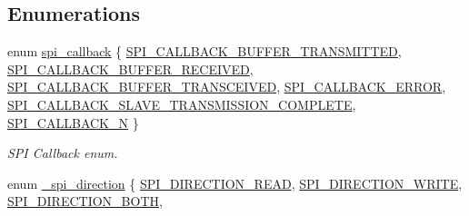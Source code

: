 \subsection*{Enumerations}
\begin{DoxyCompactItemize}
\item 
enum \mbox{\hyperlink{group__asfdoc__sam0__sercom__spi__group_ga4afb8830e0197ec11f6beb8140210a88}{spi\+\_\+callback}} \{ \newline
\mbox{\hyperlink{group__asfdoc__sam0__sercom__spi__group_gga4afb8830e0197ec11f6beb8140210a88a457c19f75d284d1664cc38b0f1e1eb81}{S\+P\+I\+\_\+\+C\+A\+L\+L\+B\+A\+C\+K\+\_\+\+B\+U\+F\+F\+E\+R\+\_\+\+T\+R\+A\+N\+S\+M\+I\+T\+T\+ED}}, 
\mbox{\hyperlink{group__asfdoc__sam0__sercom__spi__group_gga4afb8830e0197ec11f6beb8140210a88a7da8cc036860fc86ef36aeeffe9088ec}{S\+P\+I\+\_\+\+C\+A\+L\+L\+B\+A\+C\+K\+\_\+\+B\+U\+F\+F\+E\+R\+\_\+\+R\+E\+C\+E\+I\+V\+ED}}, 
\mbox{\hyperlink{group__asfdoc__sam0__sercom__spi__group_gga4afb8830e0197ec11f6beb8140210a88ac2110b62e8233f66ccecd240e8d256a8}{S\+P\+I\+\_\+\+C\+A\+L\+L\+B\+A\+C\+K\+\_\+\+B\+U\+F\+F\+E\+R\+\_\+\+T\+R\+A\+N\+S\+C\+E\+I\+V\+ED}}, 
\mbox{\hyperlink{group__asfdoc__sam0__sercom__spi__group_gga4afb8830e0197ec11f6beb8140210a88a3c76f7df3c189cd31938fcf438427051}{S\+P\+I\+\_\+\+C\+A\+L\+L\+B\+A\+C\+K\+\_\+\+E\+R\+R\+OR}}, 
\newline
\mbox{\hyperlink{group__asfdoc__sam0__sercom__spi__group_gga4afb8830e0197ec11f6beb8140210a88a75545a7657914031640e2890220ea2ea}{S\+P\+I\+\_\+\+C\+A\+L\+L\+B\+A\+C\+K\+\_\+\+S\+L\+A\+V\+E\+\_\+\+T\+R\+A\+N\+S\+M\+I\+S\+S\+I\+O\+N\+\_\+\+C\+O\+M\+P\+L\+E\+TE}}, 
\mbox{\hyperlink{group__asfdoc__sam0__sercom__spi__group_gga4afb8830e0197ec11f6beb8140210a88a5941b69aff1bf66f116be84ddf1c1218}{S\+P\+I\+\_\+\+C\+A\+L\+L\+B\+A\+C\+K\+\_\+N}}
 \}
\begin{DoxyCompactList}\small\item\em S\+PI Callback enum. \end{DoxyCompactList}\item 
enum \mbox{\hyperlink{group__asfdoc__sam0__sercom__spi__group_ga3790f767d410bc7d70fe0772fe7044f7}{\+\_\+spi\+\_\+direction}} \{ \mbox{\hyperlink{group__asfdoc__sam0__sercom__spi__group_gga3790f767d410bc7d70fe0772fe7044f7a103cc0246cfe23a4bdbd9919691bab19}{S\+P\+I\+\_\+\+D\+I\+R\+E\+C\+T\+I\+O\+N\+\_\+\+R\+E\+AD}}, 
\mbox{\hyperlink{group__asfdoc__sam0__sercom__spi__group_gga3790f767d410bc7d70fe0772fe7044f7a58378c769c218216a742f064d20afbc5}{S\+P\+I\+\_\+\+D\+I\+R\+E\+C\+T\+I\+O\+N\+\_\+\+W\+R\+I\+TE}}, 
\mbox{\hyperlink{group__asfdoc__sam0__sercom__spi__group_gga3790f767d410bc7d70fe0772fe7044f7aa7d6441909cdfbb860d18b6b7d78fcc0}{S\+P\+I\+\_\+\+D\+I\+R\+E\+C\+T\+I\+O\+N\+\_\+\+B\+O\+TH}}, 

\end{DoxyCompactItemize}
